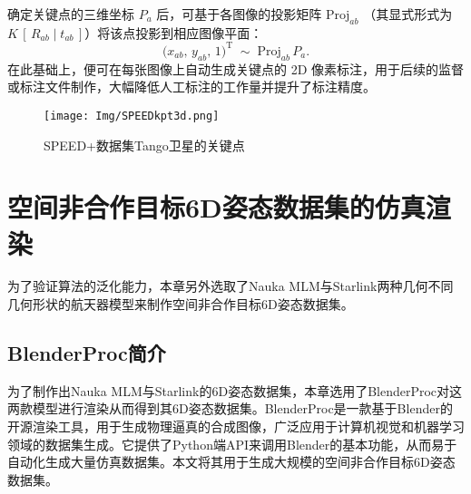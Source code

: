 确定关键点的三维坐标 \(P_a\) 后，可基于各图像的投影矩阵 \(\mathrm{Proj}_{ab}\)
（其显式形式为 \(K\,[\,R_{ab}\mid t_{ab}\,]\)）将该点投影到相应图像平面：
\begin{equation}
	\bigl(x_{ab},\,y_{ab},\,1\bigr)^\mathrm{T}
	\;\sim\;
	\mathrm{Proj}_{ab}\,P_a.
\end{equation}
在此基础上，便可在每张图像上自动生成关键点的 2D 像素标注，用于后续的监督或标注文件制作，大幅降低人工标注的工作量并提升了标注精度。





\begin{figure}[htbp]
	\centering
	\texttt{[image: Img/SPEEDkpt3d.png]}
	\caption{SPEED+数据集Tango卫星的关键点}
	\label{fig:SPEEDpluskpt}
	\vspace{-3ex}
\end{figure}

\section{空间非合作目标6D姿态数据集的仿真渲染}

为了验证算法的泛化能力，本章另外选取了Nauka MLM与Starlink两种几何不同几何形状的航天器模型来制作空间非合作目标6D姿态数据集。

\subsection{BlenderProc简介}
为了制作出Nauka MLM与Starlink的6D姿态数据集，本章选用了BlenderProc对这两款模型进行渲染从而得到其6D姿态数据集。BlenderProc是一款基于Blender的开源渲染工具，用于生成物理逼真的合成图像，广泛应用于计算机视觉和机器学习领域的数据集生成。它提供了Python端API来调用Blender的基本功能，从而易于自动化生成大量仿真数据集。本文将其用于生成大规模的空间非合作目标6D姿态数据集。

